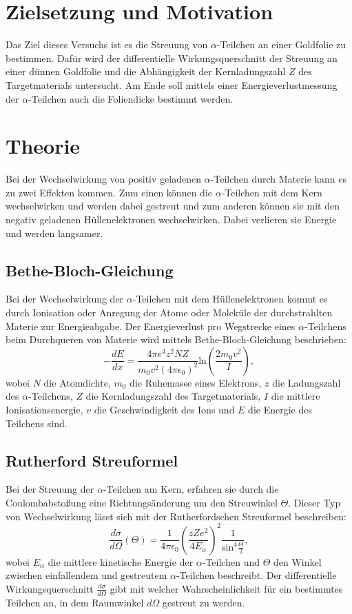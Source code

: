 \section{Zielsetzung und Motivation}
\label{sec:ZielsetzungundMotivation}
Das Ziel dieses Versuchs ist es die Streuung von $\alpha$-Teilchen an einer Goldfolie zu bestimmen. Dafür wird der differentielle Wirkungsquerschnitt der Streuung an einer dünnen Goldfolie und die Abhängigkeit der Kernladungszahl $Z$ des Targetmaterials untersucht.
Am Ende soll mittels einer Energieverlustmessung der $\alpha$-Teilchen auch die Foliendicke bestimmt werden.

\section{Theorie}
\label{sec:Theorie}
Bei der Wechselwirkung von positiv geladenen $\alpha$-Teilchen durch Materie kann es zu zwei Effekten kommen. Zum einen können die $\alpha$-Teilchen mit dem Kern wechselwirken und werden dabei gestreut und zum anderen können sie mit den negativ geladenen Hüllenelektronen wechselwirken. Dabei verlieren sie Energie und werden langsamer. 

\subsection{Bethe-Bloch-Gleichung}
Bei der Wechselwirkung der $\alpha$-Teilchen mit dem Hüllenelektronen kommt es durch Ionisation oder Anregung der Atome oder Moleküle der durchstrahlten Materie zur Energieabgabe. Der Energieverlust pro Wegstrecke eines $\alpha$-Teilchens beim Durchqueren von Materie wird mittels Bethe-Bloch-Gleichung beschrieben:
\begin{equation}
\label{eq:bethebloch}
-\frac{dE}{dx} = \frac{4 \pi e^4 z^2 N Z}{m_0 v^2 (4\pi\epsilon_0)^2}\text{ln}\left(\frac{2 m_0 v^2}{I}\right),
\end{equation}
wobei $N$ die Atomdichte, $m_0$ die Ruhemasse eines Elektrons, $z$ die Ladungszahl des $\alpha$-Teilchens, $Z$ die Kernladungszahl des Targetmaterials, $I$ die mittlere Ionisationsenergie, $v$ die Geschwindigkeit des Ions und $E$ die Energie des Teilchens sind.

\subsection{Rutherford Streuformel}
Bei der Streuung der $\alpha$-Teilchen am Kern, erfahren sie durch die Coulombabstoßung eine Richtungsänderung um den Streuwinkel $\Theta$. Dieser Typ von Wechselwirkung lässt sich mit der Rutherfordschen Streuformel beschreiben:
\begin{equation}
\frac{d\sigma}{d\Omega}(\Theta) = \frac{1}{4 \pi \epsilon_0} \left(\frac{z Z e^2}{4 E_\alpha}\right)^2 \frac{1}{\text{sin}^4 \frac{\Theta}{2}},
\end{equation}
wobei $E_\alpha$ die mittlere kinetische Energie der $\alpha$-Teilchen und $\Theta$ den Winkel zwischen einfallendem und gestreutem $\alpha$-Teilchen beschreibt. Der differentielle Wirkungsquerschnitt $\frac{d\sigma}{d\Omega}$ gibt mit welcher Wahrscheinlichkeit für ein bestimmtes Teilchen an, in dem Raumwinkel $d\Omega$ gestreut zu werden.